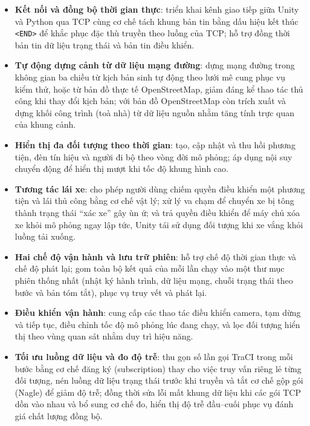 \documentclass[../DoAn.tex]{subfiles}
\begin{document}
\begin{itemize}[leftmargin=2em]
	\item \textbf{Kết nối và đồng bộ thời gian thực}: triển khai kênh giao tiếp
	giữa Unity và Python qua TCP cùng cơ chế tách khung bản tin bằng dấu hiệu kết
	thúc \texttt{<END>} để khắc phục đặc thù truyền theo luồng của TCP; hỗ trợ
	đồng thời bản tin dữ liệu trạng thái và bản tin điều khiển.
	\item \textbf{Tự động dựng cảnh từ dữ liệu mạng đường}: dựng mạng đường trong
	không gian ba chiều từ kịch bản sinh tự động theo lưới mê cung phục vụ kiểm
	thử, hoặc từ bản đồ thực tế OpenStreetMap, giảm đáng kể thao tác thủ công khi
	thay đổi kịch bản; với bản đồ OpenStreetMap còn trích xuất và dựng khối công
	trình (toà nhà) từ dữ liệu nguồn nhằm tăng tính trực quan của khung cảnh.
	\item \textbf{Hiển thị đa đối tượng theo thời gian}: tạo, cập nhật và thu hồi
	phương tiện, đèn tín hiệu và người đi bộ theo vòng đời mô phỏng; áp dụng nội
	suy chuyển động để hiển thị mượt khi tốc độ khung hình cao.
	\item \textbf{Tương tác lái xe}: cho phép người dùng chiếm quyền điều khiển
	một phương tiện và lái thủ công bằng cơ chế vật lý; xử lý va chạm để chuyển
	xe bị tông thành trạng thái ``xác xe'' gây ùn ứ; và trả quyền điều khiển để
	máy chủ xóa xe khỏi mô phỏng ngay lập tức, Unity tái sử dụng đối tượng khi xe
	vắng khỏi luồng tải xuống.
	\item \textbf{Hai chế độ vận hành và lưu trữ phiên}: hỗ trợ chế độ thời gian
	thực và chế độ phát lại; gom toàn bộ kết quả của mỗi lần chạy vào một thư mục
	phiên thống nhất (nhật ký hành trình, dữ liệu mạng, chuỗi trạng thái theo bước
	và bản tóm tắt), phục vụ truy vết và phát lại.
	\item \textbf{Điều khiển vận hành}: cung cấp các thao tác điều khiển camera,
	tạm dừng và tiếp tục, điều chỉnh tốc độ mô phỏng lúc đang chạy, và lọc đối
	tượng hiển thị theo vùng quan sát nhằm duy trì hiệu năng.
	\item \textbf{Tối ưu luồng dữ liệu và đo độ trễ}: thu gọn số lần gọi
	\gls{TraCI} trong mỗi bước bằng cơ chế đăng ký (subscription) thay cho việc
	truy vấn riêng lẻ từng đối tượng, nén luồng dữ liệu trạng thái trước khi
	truyền và tắt cơ chế gộp gói (Nagle) để giảm độ trễ; đồng thời sửa lỗi mất
	khung dữ liệu khi các gói TCP dồn vào nhau và bổ sung cơ chế đo, hiển
	thị độ trễ đầu--cuối phục vụ đánh giá chất lượng đồng bộ.
\end{itemize}
\end{document}
